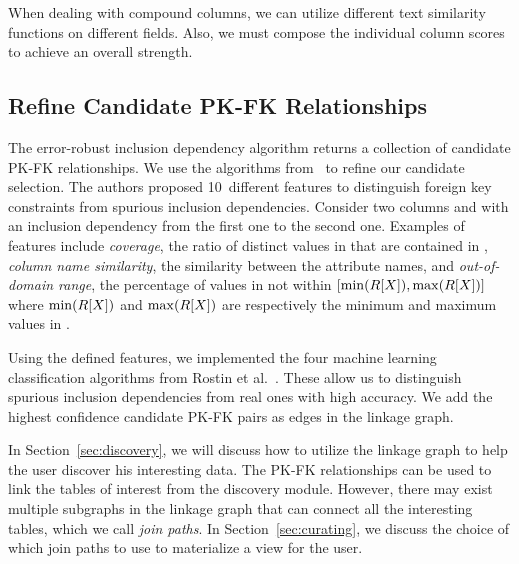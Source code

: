 When dealing with compound columns, we can utilize different text similarity functions on different fields. 
Also, we must compose the individual column scores to achieve an overall strength.


\subsection{Refine Candidate PK-FK Relationships}
\label{subsec:refine}


The error-robust inclusion dependency algorithm returns a collection of candidate PK-FK relationships.
We use the algorithms from~\cite{DBLP:conf/webdb/RostinABNL09} 
to refine our candidate selection. The authors proposed 10~different features to distinguish foreign key constraints from spurious inclusion dependencies. Consider two columns \RX and \SY with an inclusion dependency from the first one to the second one. 
Examples of features include 
\emph{coverage}, the ratio of distinct values in \RX that are contained in \SY, 
\emph{column name similarity}, the similarity between the attribute names, 
and \emph{out-of-domain range}, the percentage of values in \SY not within $[\min(R[X]), \max(R[X])]$ where $\min(R[X])$ and $\max(R[X])$ are respectively the minimum and maximum values in \RX.

Using the defined features, we implemented the four machine learning classification algorithms from Rostin et al.~\cite{DBLP:conf/webdb/RostinABNL09}. These allow us to distinguish spurious inclusion dependencies from real ones with high accuracy.   We add the highest confidence candidate PK-FK pairs as edges in the linkage graph.

In Section~\ref{sec:discovery}, we will discuss how to utilize the linkage graph to help the user discover his interesting data. 
The PK-FK relationships can be used to link the tables of interest from the discovery module. However, there may exist multiple subgraphs in the linkage graph that can connect all the interesting tables, which we call \emph{join paths}. In Section~\ref{sec:curating}, we discuss the choice of which join paths to use to materialize a view for the user.
